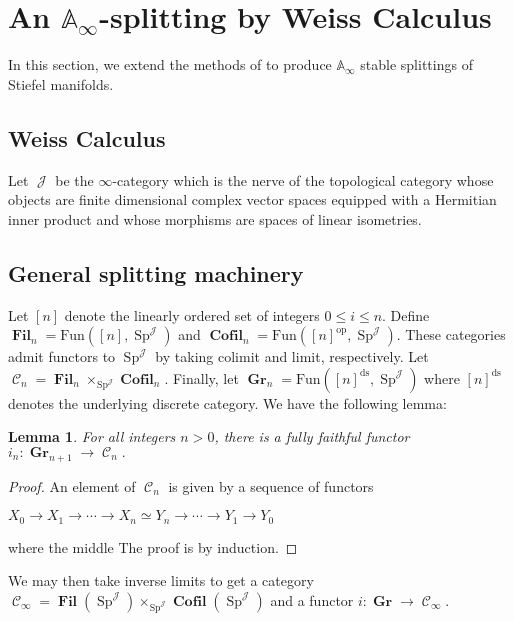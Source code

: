 \documentclass[oneside]{amsart}
\theoremstyle{definition}
\theoremstyle{plain}
\newtheorem{lem}[nul]{Lemma}
\DeclareMathOperator{\C}{\mathcal{C}}
\DeclareMathOperator{\Gr}{\textbf{Gr}}
\DeclareMathOperator{\Fil}{\textbf{Fil}}
\DeclareMathOperator{\Sp}{\text{Sp}}
\DeclareMathOperator{\J}{\mathcal{J}}
\DeclareMathOperator{\Cofil}{\textbf{Cofil}}
\begin{document}
\section{An \texorpdfstring{$\mathbb{A}_\infty$}{Aoo}-splitting by Weiss Calculus}


In this section, we extend the methods of \cite{Arone} to produce $\mathbb{A}_\infty$ stable splittings of Stiefel manifolds.  
\subsection{Weiss Calculus}
Let $\J$ be the $\infty$-category which is the nerve of the topological category whose objects are finite dimensional complex vector spaces equipped with a Hermitian inner product and whose morphisms are spaces of linear isometries.  


\subsection{General splitting machinery}


Let $[n]$ denote the linearly ordered set of integers $0\leq i\leq n$.  Define $\Fil_n = \text{Fun}([n], \Sp^{\J})$ and $\Cofil_n = \text{Fun}([n]^{\text{op}},\Sp^{\J})$.  These categories admit functors to $\Sp^{\J}$ by taking colimit and limit, respectively.  Let $\C_n = \Fil_n \times_{\Sp^{\J}} \Cofil_n.$  Finally, let $\Gr_n = \text{Fun}([n]^{\text{ds}}, \Sp^{\J})$ where $[n]^{\text{ds}}$ denotes the underlying discrete category.  We have the following lemma:

\begin{lem}
For all integers $n>0$, there is a fully faithful functor $i_n:\Gr_{n+1} \to \C_n.$  
\end{lem}
\begin{proof}
An element of $\C_n$ is given by a sequence of functors 
\begin{center}
$X_0 \longrightarrow X_1 \longrightarrow \cdots \longrightarrow X_n \simeq Y_n \longrightarrow \cdots \longrightarrow Y_1 \longrightarrow Y_0$ 
\end{center}
where the middle 
The proof is by induction.  
\end{proof}

We may then take inverse limits to get a category $\C_\infty = \Fil(\Sp^{\J}) \times_{\Sp^{\J}} \Cofil(\Sp^{\J})$ and a functor $i: \Gr \to \C_\infty$. 
\end{document}
